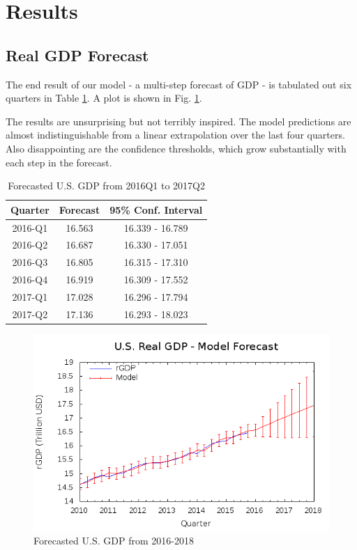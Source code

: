 \section{Results}

\subsection{Real GDP Forecast}
    
    The end result of our model - a multi-step forecast of GDP - is tabulated 
    out six quarters in Table \ref{tab:forecast}.  A plot is shown in Fig. 
    \ref{fig:rgdp-forecast}.
    
    The results are unsurprising but not terribly inspired. The model 
    predictions are almost indistinguishable from a linear extrapolation over the
    last four quarters.  Also disappointing are the confidence thresholds, which
    grow substantially with each step in the forecast.

    \begin{table}[!h]
        \centering
        \begin{tabular}{c c c} 
            \bf{Quarter} & \bf{Forecast} & \bf{95\% Conf. Interval} \\ \hline
            2016-Q1 & 16.563 & 16.339 - 16.789 \\
            2016-Q2 & 16.687 & 16.330 - 17.051 \\
            2016-Q3 & 16.805 & 16.315 - 17.310 \\
            2016-Q4 & 16.919 & 16.309 - 17.552 \\
            2017-Q1 & 17.028 & 16.296 - 17.794 \\
            2017-Q2 & 17.136 & 16.293 - 18.023 \\
        \end{tabular}
        \caption{Forecasted U.S. GDP from 2016Q1 to 2017Q2}
        \label{tab:forecast}
    \end{table}
    
    \begin{figure}
        \includegraphics[width=\textwidth]{../img/model1-rgdp-forecast.png}
        \caption{Forecasted U.S. GDP from 2016-2018}
        \label{fig:rgdp-forecast}
    \end{figure}

